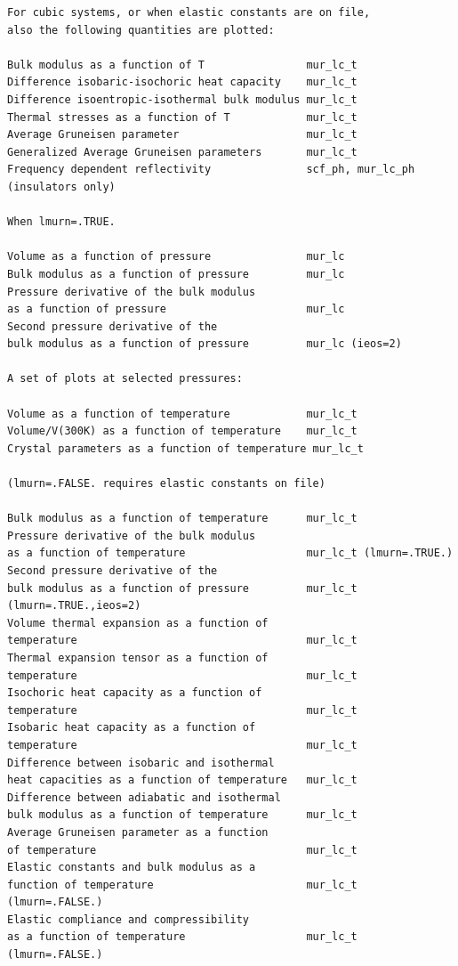 \documentclass[12pt,a4paper,twoside]{report}
\begin{document}
\begin{footnotesize}
\begin{verbatim}
For cubic systems, or when elastic constants are on file,
also the following quantities are plotted:

Bulk modulus as a function of T                mur_lc_t
Difference isobaric-isochoric heat capacity    mur_lc_t
Difference isoentropic-isothermal bulk modulus mur_lc_t
Thermal stresses as a function of T            mur_lc_t
Average Gruneisen parameter                    mur_lc_t
Generalized Average Gruneisen parameters       mur_lc_t     
Frequency dependent reflectivity               scf_ph, mur_lc_ph
(insulators only)

When lmurn=.TRUE.

Volume as a function of pressure               mur_lc
Bulk modulus as a function of pressure         mur_lc
Pressure derivative of the bulk modulus 
as a function of pressure                      mur_lc
Second pressure derivative of the
bulk modulus as a function of pressure         mur_lc (ieos=2)

A set of plots at selected pressures:

Volume as a function of temperature            mur_lc_t
Volume/V(300K) as a function of temperature    mur_lc_t
Crystal parameters as a function of temperature mur_lc_t

(lmurn=.FALSE. requires elastic constants on file)

Bulk modulus as a function of temperature      mur_lc_t
Pressure derivative of the bulk modulus        
as a function of temperature                   mur_lc_t (lmurn=.TRUE.)
Second pressure derivative of the              
bulk modulus as a function of pressure         mur_lc_t (lmurn=.TRUE.,ieos=2)
Volume thermal expansion as a function of             
temperature                                    mur_lc_t
Thermal expansion tensor as a function of             
temperature                                    mur_lc_t
Isochoric heat capacity as a function of       
temperature                                    mur_lc_t
Isobaric heat capacity as a function of        
temperature                                    mur_lc_t
Difference between isobaric and isothermal     
heat capacities as a function of temperature   mur_lc_t
Difference between adiabatic and isothermal     
bulk modulus as a function of temperature      mur_lc_t
Average Gruneisen parameter as a function     
of temperature                                 mur_lc_t
Elastic constants and bulk modulus as a 
function of temperature                        mur_lc_t (lmurn=.FALSE.)
Elastic compliance and compressibility
as a function of temperature                   mur_lc_t (lmurn=.FALSE.)


\end{verbatim}
\end{footnotesize}
\end{document}
